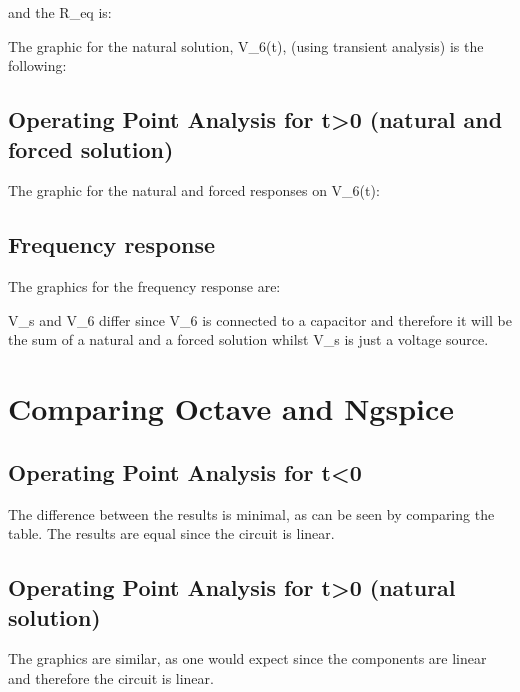 
\par and the R_eq is:


\par 

The graphic for the natural solution, V_6(t), (using transient analysis) is the following:


\subsection{Operating Point Analysis for t>0 (natural and forced solution)}
\par

The graphic for the natural and forced responses on V_6(t):

\par
\subsection{Frequency response}
The graphics for the frequency response are:

\par
V_s and V_6 differ since V_6 is connected to a capacitor and therefore it will be the sum of a natural and a forced solution whilst V_s is just a voltage source. %

\section{Comparing Octave and Ngspice}

\subsection{Operating Point Analysis for t<0}
The difference between the results is minimal, as can be seen by comparing the table. The results are equal since the circuit is linear.

\par

\subsection{Operating Point Analysis for t>0 (natural solution)}
The graphics are similar, as one would expect since the components are linear and therefore the circuit is linear.
\par

